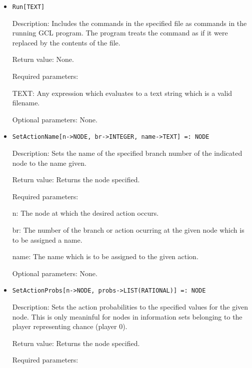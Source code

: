 \begin{itemize}
\item

\protect \large \begin{verbatim}
Run[TEXT]
\end{verbatim}\normalsize

\bd
\item
[Description:] Includes the commands in the specified file as commands
in the running GCL program.  The program treats the command as if it
were replaced by the contents of the file.
\item
[Return value:] None.
\item
[Required parameters:]\hfil\null
	
\bd
\item
[TEXT:] Any expression which evaluates to a text string which is a
valid filename.
\ed

\item
[Optional parameters:] None.
\ed

\item

\protect \large \begin{verbatim}
SetActionName[n->NODE, br->INTEGER, name->TEXT] =: NODE
\end{verbatim}\normalsize

\bd
\item
[Description:] Sets the name of the specified branch number of the
indicated node to the name given.
\item
[Return value:] Returns the node specified.
\item
[Required parameters:]\hfil\null
	
\bd
\item
[n:] The node at which the desired action occurs.
\item
[br:] The number of the branch or action ocurring at the given node
which is to be assigned a name.
\item
[name:] The name which is to be assigned to the given action.
\ed

\item
[Optional parameters:] None.

\ed

\item

\protect \large \begin{verbatim}
SetActionProbs[n->NODE, probs->LIST(RATIONAL)] =: NODE
\end{verbatim}\normalsize

\bd
\item
[Description:] Sets the action probabilities to the specified values
for the given node.  This is only meaninful for nodes in information
sets belonging to the player representing chance (player 0).
\item
[Return value:] Returns the node specified.
\item
[Required parameters:]\hfil\null
	

\end{itemize}
